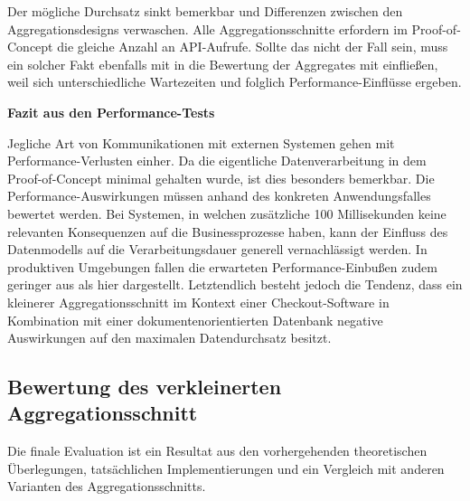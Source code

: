 Der mögliche Durchsatz sinkt bemerkbar und Differenzen zwischen den Aggregationsdesigns verwaschen. Alle Aggregationsschnitte erfordern im Proof-of-Concept die gleiche Anzahl an API-Aufrufe. Sollte das nicht der Fall sein, muss ein solcher Fakt ebenfalls mit in die Bewertung der Aggregates mit einfließen, weil sich unterschiedliche Wartezeiten und folglich Performance-Einflüsse ergeben. 


\textbf{Fazit aus den Performance-Tests}

Jegliche Art von Kommunikationen mit externen Systemen gehen mit Performance-Verlusten einher. Da die eigentliche Datenverarbeitung in dem Proof-of-Concept minimal gehalten wurde, ist dies besonders bemerkbar. Die Performance-Auswirkungen müssen anhand des konkreten Anwendungsfalles bewertet werden. Bei Systemen, in welchen zusätzliche 100 Millisekunden keine relevanten Konsequenzen auf die Businessprozesse haben, kann der Einfluss des Datenmodells auf die Verarbeitungsdauer generell vernachlässigt werden. In produktiven Umgebungen fallen die erwarteten Performance-Einbußen zudem geringer aus als hier dargestellt. Letztendlich besteht jedoch die Tendenz, dass ein kleinerer Aggregationsschnitt im Kontext einer Checkout-Software in Kombination mit einer dokumentenorientierten Datenbank negative Auswirkungen auf den maximalen Datendurchsatz besitzt.

\subsection{Bewertung des verkleinerten Aggregationsschnitt}

Die finale Evaluation ist ein Resultat aus den vorhergehenden theoretischen Überlegungen, tatsächlichen Implementierungen und ein Vergleich mit anderen Varianten des Aggregationsschnitts.

